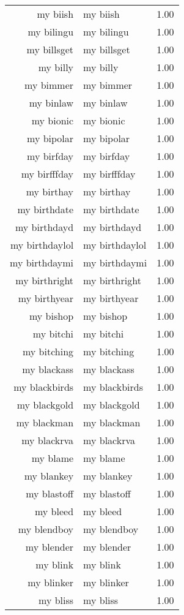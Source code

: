 \begin{table}[ht]
\begin{tabular}{rlr}
  my biish & my biish & 1.00 \\ 
  my bilingu & my bilingu & 1.00 \\ 
  my billsget & my billsget & 1.00 \\ 
  my billy & my billy & 1.00 \\ 
  my bimmer & my bimmer & 1.00 \\ 
  my binlaw & my binlaw & 1.00 \\ 
  my bionic & my bionic & 1.00 \\ 
  my bipolar & my bipolar & 1.00 \\ 
  my birfday & my birfday & 1.00 \\ 
  my birfffday & my birfffday & 1.00 \\ 
  my birthay & my birthay & 1.00 \\ 
  my birthdate & my birthdate & 1.00 \\ 
  my birthdayd & my birthdayd & 1.00 \\ 
  my birthdaylol & my birthdaylol & 1.00 \\ 
  my birthdaymi & my birthdaymi & 1.00 \\ 
  my birthright & my birthright & 1.00 \\ 
  my birthyear & my birthyear & 1.00 \\ 
  my bishop & my bishop & 1.00 \\ 
  my bitchi & my bitchi & 1.00 \\ 
  my bitching & my bitching & 1.00 \\ 
  my blackass & my blackass & 1.00 \\ 
  my blackbirds & my blackbirds & 1.00 \\ 
  my blackgold & my blackgold & 1.00 \\ 
  my blackman & my blackman & 1.00 \\ 
  my blackrva & my blackrva & 1.00 \\ 
  my blame & my blame & 1.00 \\ 
  my blankey & my blankey & 1.00 \\ 
  my blastoff & my blastoff & 1.00 \\ 
  my bleed & my bleed & 1.00 \\ 
  my blendboy & my blendboy & 1.00 \\ 
  my blender & my blender & 1.00 \\ 
  my blink & my blink & 1.00 \\ 
  my blinker & my blinker & 1.00 \\ 
  my bliss & my bliss & 1.00 \\ 

\end{tabular}
\end{table}
